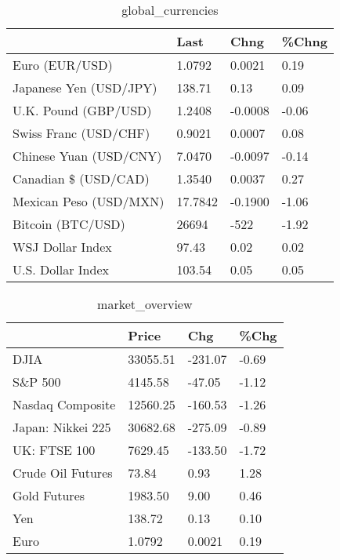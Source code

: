 \documentclass{article}%
\begin{document}
%


\begin{table}[htbp]%
\caption{global\_currencies}%
\centering%
\begin{adjustbox}{width=1\textwidth}%
\begin{tabular}{llll}
\toprule
                       &    Last &    Chng & \%Chng \\
\midrule
        Euro (EUR/USD) &  1.0792 &  0.0021 &  0.19 \\
Japanese Yen (USD/JPY) &  138.71 &    0.13 &  0.09 \\
  U.K. Pound (GBP/USD) &  1.2408 & -0.0008 & -0.06 \\
 Swiss Franc (USD/CHF) &  0.9021 &  0.0007 &  0.08 \\
Chinese Yuan (USD/CNY) &  7.0470 & -0.0097 & -0.14 \\
  Canadian \$ (USD/CAD) &  1.3540 &  0.0037 &  0.27 \\
Mexican Peso (USD/MXN) & 17.7842 & -0.1900 & -1.06 \\
     Bitcoin (BTC/USD) &   26694 &    -522 & -1.92 \\
      WSJ Dollar Index &   97.43 &    0.02 &  0.02 \\
     U.S. Dollar Index &  103.54 &    0.05 &  0.05 \\
\bottomrule
\end{tabular}
%
\end{adjustbox}%
\end{table}

%


\begin{table}[htbp]%
\caption{market\_overview}%
\centering%
\begin{adjustbox}{width=1\textwidth}%
\begin{tabular}{llll}
\toprule
                  &    Price &     Chg &  \%Chg \\
\midrule
             DJIA & 33055.51 & -231.07 & -0.69 \\
          S\&P 500 &  4145.58 &  -47.05 & -1.12 \\
 Nasdaq Composite & 12560.25 & -160.53 & -1.26 \\
Japan: Nikkei 225 & 30682.68 & -275.09 & -0.89 \\
     UK: FTSE 100 &  7629.45 & -133.50 & -1.72 \\
Crude Oil Futures &    73.84 &    0.93 &  1.28 \\
     Gold Futures &  1983.50 &    9.00 &  0.46 \\
              Yen &   138.72 &    0.13 &  0.10 \\
             Euro &   1.0792 &  0.0021 &  0.19 \\
\bottomrule
\end{tabular}
%
\end{adjustbox}%
\end{table}

%
\end{document}
